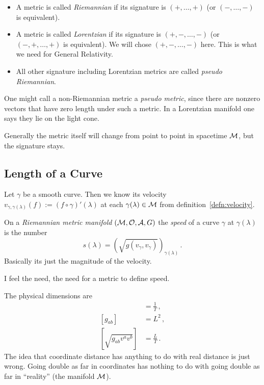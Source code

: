 \begin{defn}
    \begin{itemize}
        \item A metric is called \textit{Riemannian} if its signature is
            $(+, \ldots, +)$ (or $(-, \ldots, -)$ is equivalent).
        \item A metric is called \textit{Lorentzian} if its signature is
            $(+,-, \ldots, -)$ (or $(-,+, \ldots, +)$ is equivalent).
            We will chose $(+,-, \ldots, -)$ here.
            This is what we need for General Relativity.
        \item All other signature including Lorentzian metrics are called
            \textit{pseudo Riemannian}.
    \end{itemize}
\end{defn}
\begin{note}
    One might call a non-Riemannian metric a \textit{pseudo metric}, since
    there are nonzero vectors that have zero length under such a metric.
    In a Lorentzian manifold one says they lie on the light cone.
\end{note}
\begin{note}
    Generally the metric itself will change from point to point in spacetime $\mathcal{M}$,
    but the signature stays.
\end{note}
\subsection{Length of a Curve}
Let $\gamma$ be a smooth curve.
Then we know its velocity $v_{\gamma,\gamma(\lambda)}(f) := (f \circ \gamma)'(\lambda)$
at each $\gamma(\lambda)\in \mathcal{M}$ from definition~\ref{defn:velocity}.

\begin{defn}
    On a \textit{Riemannian metric manifold} $(\mathcal{M}, \mathcal{O}, \mathcal{A}, G)$ the
    \textit{speed} of a curve $\gamma$ at $\gamma(\lambda)$ is the number
    \begin{equation}
        s(\lambda) = \left( \sqrt{g(v_\gamma, v_\gamma)} \right)_{\gamma(\lambda)}\,.
    \end{equation}
    Basically its just the magnitude of the velocity.
\end{defn}
\begin{note}
    I feel the need, the need for  a metric to define speed.
\end{note}
\begin{note}
    The physical dimensions are
    \begin{align*}
        [v^a] &= \frac{1}{T}\,,\\
        [g_{ab}] &= L^2\,,\\
        [\sqrt{g_{ab}v^av^b}] &= \frac{L}{T}\,.
    \end{align*}
    The idea that coordinate distance has anything to do with real distance is just wrong.
    Going double as far in coordinates has nothing to do with going double as far
    in ``reality'' (the manifold $\mathcal{M}$).
\end{note}

